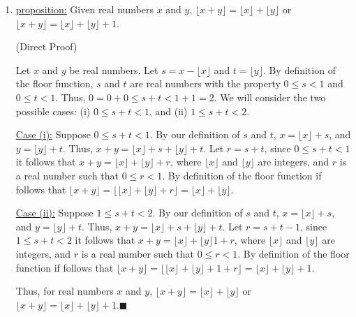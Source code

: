 \documentclass{article}
\theoremstyle{definition}
\begin{document}
	\begin{enumerate}
		\item[2] \underline{proposition:} Given real numbers $x$ and $y$,
		$\lfloor x+y \rfloor=\lfloor x\rfloor + \lfloor y \rfloor$ or
		$\lfloor x+y \rfloor=\lfloor x\rfloor + \lfloor y \rfloor + 1$.

		\vspace{0.4cm}

		 (Direct Proof)

		\vspace{0.2cm}

		Let $x$ and $y$ be real numbers. Let $s=x-\lfloor x\rfloor$ and
		$t=\lfloor y\rfloor$. By definition of the floor function, $s$ and
		$t$ are real numbers with the property $0\le s<1$ and $0\le t<1$.
		Thus, $0=0+0\le s+t < 1+1=2$. We will consider the two possible
		cases: (i) $0\le s+t<1$, and (ii) $1\le s+t<2$.

		\underline{Case (i):}  Suppose $0\le s+t<1$. By our definition of
		$s$ and $t$, $x=\lfloor x\rfloor +s$, and $y=\lfloor y\rfloor +t$.
		Thus, $x+y=\lfloor x\rfloor +s + \lfloor y\rfloor +t$. Let $r=s+t$,
		since $0\le s+t<1$ it follows that $x+y=\lfloor x\rfloor +\lfloor
		y\rfloor +r$, where $\lfloor x\rfloor$ and $\lfloor y\rfloor$ are
		integers, and $r$ is a real number such that $0\le r<1$. By
		definition of the floor function if follows that $\lfloor
		x+y\rfloor=\lfloor\lfloor x\rfloor + \lfloor y\rfloor
		+r\rfloor=\lfloor x\rfloor + \lfloor y\rfloor$.

		\underline{Case (ii):}  Suppose $1\le s+t<2$. By our definition of
		$s$ and $t$, $x=\lfloor x\rfloor +s$, and $y=\lfloor y\rfloor +t$.
		Thus, $x+y=\lfloor x\rfloor +s + \lfloor y\rfloor +t$. Let
		$r=s+t-1$, since $1\le s+t<2$ it follows that $x+y=\lfloor x\rfloor
		+\lfloor y\rfloor 1+r$, where $\lfloor x\rfloor$ and $\lfloor
		y\rfloor$ are integers, and $r$ is a real number such that $0\le
		r<1$. By definition of the floor function if follows that $\lfloor
		x+y\rfloor=\lfloor\lfloor x\rfloor + \lfloor y\rfloor
		+1+r\rfloor=\lfloor x\rfloor + \lfloor y\rfloor+1$.


		Thus, for real numbers $x$ and $y$, $\lfloor x+y \rfloor=\lfloor
		x\rfloor + \lfloor y \rfloor$ or $\lfloor x+y \rfloor=\lfloor
		x\rfloor + \lfloor y \rfloor + 1. \blacksquare$
	\end{enumerate}

	\vspace{1cm}

\end{document}
